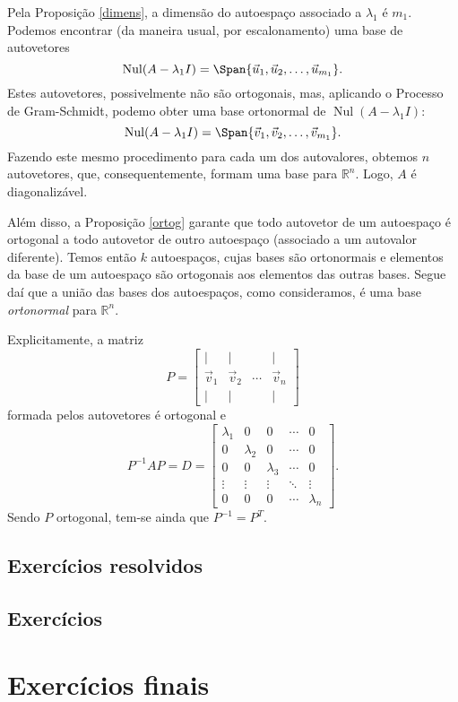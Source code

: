 Pela Proposição \ref{dimens}, a dimensão do autoespaço associado a $\lambda_1$ é $m_1$. Podemos encontrar (da maneira usual, por escalonamento) uma base de autovetores
\begin{equation}
\operatorname{Nul} (A - \lambda_1 I) = \Span \{ \vec{u}_1, \vec{u}_2, \dots, \vec{u}_{m_1} \}.
\end{equation} Estes autovetores, possivelmente não são ortogonais, mas, aplicando o Processo de Gram-Schmidt, podemo obter uma base ortonormal de $\operatorname{Nul} (A - \lambda_1 I)$:
\begin{equation}
\operatorname{Nul} (A - \lambda_1 I) = \Span \{ \vec{v}_1, \vec{v}_2, \dots, \vec{v}_{m_1} \}.
\end{equation} Fazendo este mesmo procedimento para cada um dos autovalores, obtemos $n$ autovetores, que, consequentemente, formam uma base para $\mathbb{R}^n$. Logo, $A$ é diagonalizável.

Além disso, a Proposição \ref{ortog} garante que todo autovetor de um autoespaço é ortogonal a todo autovetor de outro autoespaço (associado a um autovalor diferente). Temos então $k$ autoespaços, cujas bases são ortonormais e elementos da base de um autoespaço são ortogonais aos elementos das outras bases. Segue daí que a união das bases dos autoespaços, como consideramos, é uma base \textit{ortonormal} para $\mathbb{R}^n$.

Explicitamente, a matriz
\begin{equation}
P =
\begin{bmatrix}
| & | & & | \\
\vec{v}_1 & \vec{v}_2 & \cdots &  \vec{v}_n \\
| & | &  & |
\end{bmatrix}
\end{equation} formada pelos autovetores é ortogonal e
\begin{equation}
P^{-1} A P = D =
\begin{bmatrix}
\lambda_1 & 0 & 0 & \cdots & 0 \\
0 & \lambda_2 & 0 & \cdots & 0 \\
0 & 0 & \lambda_3 & \cdots & 0 \\
\vdots & \vdots & \vdots & \ddots & \vdots \\
0 & 0 & 0 & \cdots & \lambda_n
\end{bmatrix}.
\end{equation} Sendo $P$ ortogonal, tem-se ainda que $P^{-1} = P^T$.

\subsection*{Exercícios resolvidos}

\construirExeresol

\subsection*{Exercícios}

\construirExer

\section{Exercícios finais}

\construirExer

%
